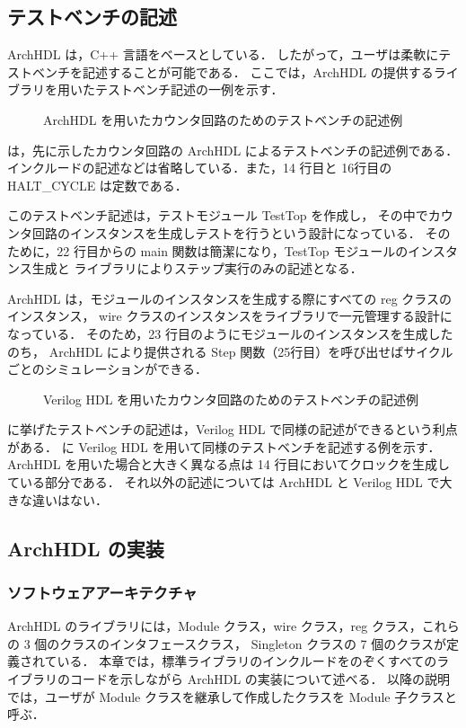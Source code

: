 \subsection{テストベンチの記述}
ArchHDL は，C++ 言語をベースとしている．
したがって，ユーザは柔軟にテストベンチを記述することが可能である．
ここでは，ArchHDL の提供するライブラリを用いたテストベンチ記述の一例を示す．

\begin{figure}[t]
 
 \caption{ArchHDL を用いたカウンタ回路のためのテストベンチの記述例}
 \label{src:test}
\end{figure}

 は，先に示したカウンタ回路の ArchHDL によるテストベンチの記述例である．
インクルードの記述などは省略している．また，14 行目と 16行目の HALT\_CYCLE は定数である．

このテストベンチ記述は，テストモジュール TestTop を作成し，
その中でカウンタ回路のインスタンスを生成しテストを行うという設計になっている．
そのために，22 行目からの main 関数は簡潔になり，TestTop モジュールのインスタンス生成と
ライブラリによりステップ実行のみの記述となる．

ArchHDL は，モジュールのインスタンスを生成する際にすべての reg クラスのインスタンス，
wire クラスのインスタンスをライブラリで一元管理する設計になっている．
そのため，23 行目のようにモジュールのインスタンスを生成したのち，
ArchHDL により提供される Step 関数（25行目）を呼び出せばサイクルごとのシミュレーションができる．

\begin{figure}[t]
 
 \caption{Verilog HDL を用いたカウンタ回路のためのテストベンチの記述例}
 \label{src:test_v}
\end{figure}

 に挙げたテストベンチの記述は，Verilog HDL で同様の記述ができるという利点がある．
 に Verilog HDL を用いて同様のテストベンチを記述する例を示す．
ArchHDL を用いた場合と大きく異なる点は 14 行目においてクロックを生成している部分である．
それ以外の記述については ArchHDL と Verilog HDL で大きな違いはない．

\subsection{ArchHDL の実装}
\subsubsection{ソフトウェアアーキテクチャ}
ArchHDL のライブラリには，Module クラス，wire クラス，reg クラス，これらの 3 個のクラスのインタフェースクラス，
Singleton クラスの 7 個のクラスが定義されている．
本章では，標準ライブラリのインクルードをのぞくすべてのライブラリのコードを示しながら ArchHDL の実装について述べる．
以降の説明では，ユーザが Module クラスを継承して作成したクラスを Module 子クラスと呼ぶ．

